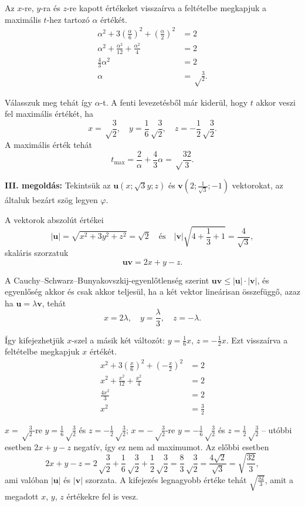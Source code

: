 \documentclass[a4paper,10pt]{article}
\renewcommand{\vec}[1]{\mathbf{#1}}
\begin{document}
Az $x$-re, $y$-ra és $z$-re kapott értékeket visszaírva a feltételbe megkapjuk a maximális $t$-hez tartozó $\alpha$ értékét.
\begin{align*}
\alpha^2+3\left(\frac{\alpha}{6}\right)^2+\left(\frac{\alpha}{2}\right)^2&=2\\
\alpha^2+\frac{\alpha^2}{12}+\frac{\alpha^2}{4}&=2\\
\frac43\alpha^2&=2\\
\alpha&=\sqrt\frac32.
\end{align*}

Válasszuk meg tehát így $\alpha$-t. A fenti levezetésből már kiderül, hogy $t$ akkor veszi fel maximális értékét, ha
\[x=\sqrt\frac32,\quad y=\frac16\sqrt\frac32,\quad z=-\frac12\sqrt\frac32.\]
A maximális érték tehát
\[t_{\max}=\frac{2}{\alpha}+\frac43\alpha=\sqrt\frac{32}{3}.\]

\medskip

{\bf III. megoldás: } Tekintsük az $\vec{u}\left(x;\sqrt3y;z\right)$ és $\vec{v}\left(2;\frac{1}{\sqrt3};-1\right)$ vektorokat, az általuk bezárt szög legyen $\varphi$.

A vektorok abszolút értékei
\[|\vec{u}|=\sqrt{x^2+3y^2+z^2}=\sqrt2\quad\text{és}\quad|\vec{v}|\sqrt{4+\frac13+1}=\frac{4}{\sqrt3},\]
skaláris szorzatuk
\[\vec{u}\vec{v}=2x+y-z.\]

A Cauchy--Schwarz--Bunyakovszkij-egyenlőtlenség szerint $\vec{u}\vec{v}\le|\vec{u}|\cdot|\vec{v}|$, és egyenlőség akkor és csak akkor teljesül, ha a két vektor lineárisan összefüggő, azaz ha $\vec{u}=\lambda\vec{v}$, tehát
\[x=2\lambda,\quad y=\frac{\lambda}{3},\quad z=-\lambda.\]

Így kifejezhetjük $x$-szel a másik két változót: $y=\frac16x$, $z=-\frac12x$. Ezt visszaírva a feltételbe megkapjuk $x$ értékét.
\begin{align*}
x^2+3\left(\frac{x}{6}\right)^2+\left(-\frac{x}{2}\right)^2&=2\\
x^2+\frac{x^2}{12}+\frac{x^2}{4}&=2\\
\frac{4x^2}{3}&=2\\
x^2&=\frac{3}{2}
\end{align*}

$x=\sqrt\frac32$-re $y=\frac16\sqrt\frac32$ és $z=-\frac12\sqrt\frac32$; $x=-\sqrt\frac32$-re $y=-\frac16\sqrt\frac32$ és $z=\frac12\sqrt\frac32$ -- utóbbi esetben $2x+y-z$ negatív, így ez nem ad maximumot. Az előbbi esetben
\[2x+y-z=2\sqrt\frac32+\frac16\sqrt\frac32+\frac12\sqrt\frac32=\frac83\sqrt\frac32=\frac{4\sqrt2}{\sqrt3}=\sqrt{\frac{32}{3}},\]
ami valóban $|\vec{u}|$ és $|\vec{v}|$ szorzata. A kifejezés legnagyobb értéke tehát $\sqrt{\frac{32}{3}}$, amit a megadott $x$, $y$, $z$ értékekre fel is vesz.
\end{document}
